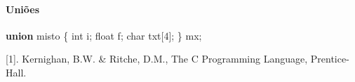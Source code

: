 \documentclass[
]{article}
\newenvironment{Shaded}{}{}
\newcommand{\DataTypeTok}[1]{\textcolor[rgb]{0.56,0.13,0.00}{#1}}
\newcommand{\DecValTok}[1]{\textcolor[rgb]{0.25,0.63,0.44}{#1}}
\newcommand{\KeywordTok}[1]{\textcolor[rgb]{0.00,0.44,0.13}{\textbf{#1}}}
\newcommand{\NormalTok}[1]{#1}
\begin{document}
\hypertarget{uniuxf5es}{%
\paragraph{Uniões}\label{uniuxf5es}}

\begin{Shaded}
\begin{Highlighting}[]
\KeywordTok{union}\NormalTok{ misto \{}
  \DataTypeTok{int}\NormalTok{ i;}
  \DataTypeTok{float}\NormalTok{ f;}
  \DataTypeTok{char}\NormalTok{ txt[}\DecValTok{4}\NormalTok{];}
\NormalTok{\} mx;}
\end{Highlighting}
\end{Shaded}

{[}1{]}. Kernighan, B.W. \& Ritche, D.M., The C Programming Language,
Prentice-Hall.
\end{document}

